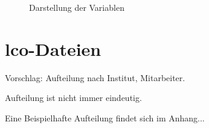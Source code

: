 \begin{figure}[!ht]
\centering{}
\caption{Darstellung der Variablen}
\label{fig:lettervarpos}
\end{figure}

\section{lco-Dateien}\label{sec:lco}

Vorschlag: Aufteilung nach Institut, Mitarbeiter.

Aufteilung ist nicht immer eindeutig.

Eine Beispielhafte Aufteilung findet sich im Anhang...

